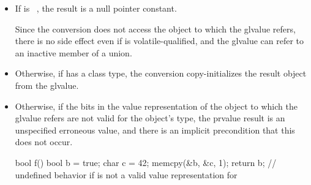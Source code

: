 \begin{itemize}

\item If  is \cv{}~, the result is a
null pointer constant.
\begin{note}
Since the conversion does not access the object to which the glvalue refers,
there is no side effect even if  is volatile-qualified, and
the glvalue can refer to an inactive member of a union.
\end{note}

\item Otherwise, if  has a class
type, the conversion copy-initializes the result object from
the glvalue.

\item Otherwise, if the bits in the value representation of
the object to which the glvalue refers
are not valid for the object's type,
the prvalue result is an unspecified erroneous value,
and there is an implicit precondition
that this does not occur.
%
%
%
%
%
\begin{example}
\begin{codeblock}
bool f() {
  bool b = true;
  char c = 42;
  memcpy(&b, &c, 1);
  return b;         // undefined behavior if  is not a valid value representation for 
}
\end{codeblock}
\end{example}


\end{itemize}
